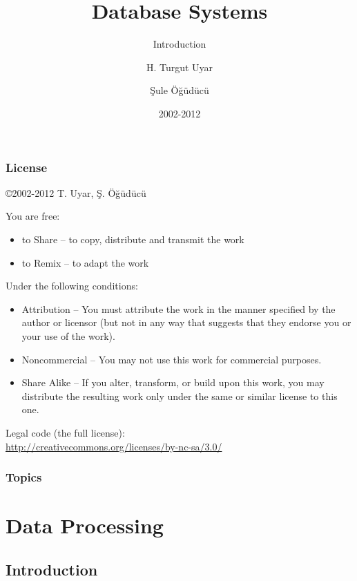 \documentclass[dvipsnames]{beamer}
\title{Database Systems}
\subtitle{Introduction}
\author{H. Turgut Uyar \and Şule Öğüdücü}
\date{2002-2012}
\theoremstyle{plain}
\begin{document}
\begin{frame}
  \titlepage
\end{frame}

\begin{frame}
  \frametitle{License}

  \hfill
  \copyright 2002-2012 T. Uyar, Ş. Öğüdücü

  \vfill
  \begin{tiny}
    You are free:
    \begin{itemize}
      \item to Share -- to copy, distribute and transmit the work
      \item to Remix -- to adapt the work
    \end{itemize}

    Under the following conditions:
    \begin{itemize}
      \item Attribution -- You must attribute the work in the manner specified by
        the author or licensor (but not in any way that suggests that they
        endorse you or your use of the work).

      \item Noncommercial -- You may not use this work for commercial purposes.

      \item Share Alike -- If you alter, transform, or build upon this work, you
        may distribute the resulting work only under the same or similar license
        to this one.
    \end{itemize}
  \end{tiny}

  \vfill
  Legal code (the full license):\\
  \url{http://creativecommons.org/licenses/by-nc-sa/3.0/}
\end{frame}

\begin{frame}
  \frametitle{Topics}
  \tableofcontents
\end{frame}

\section{Data Processing}

\subsection{Introduction}
\end{document}
